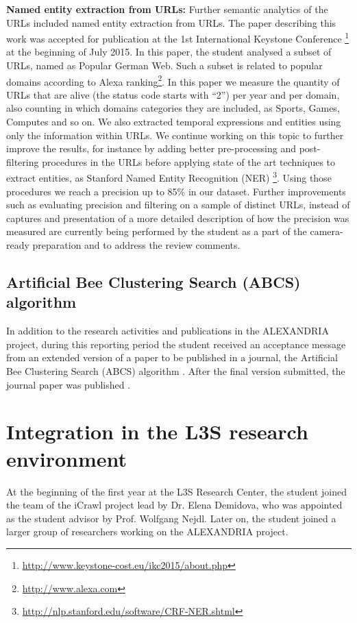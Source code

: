 \documentclass[a4paper,11pt]{report}
\begin{document}
\textbf{Named entity extraction from URLs:}
Further semantic analytics of the URLs included named entity extraction from URLs. 
The paper describing this work was accepted for publication at the 
1st International Keystone Conference
\footnote{\url{http://www.keystone-cost.eu/ikc2015/about.php}} at the beginning of
July 2015. 
In this paper, the student analysed a subset of URLs, named as Popular German
Web. Such a subset is related to popular domains according to Alexa
ranking\footnote{\url{http://www.alexa.com}}. In this paper we measure the
quantity of URLs that are alive (the status code starts with ``2'') per year and per domain, 
also counting in which domains categories they are included, as Sports, Games,
Computes and so on. We also extracted temporal expressions
and entities using only the information within URLs.
%
We continue working on this topic to further improve the results, for instance by adding better
pre-processing and post-filtering procedures in the URLs before applying state
of the art techniques to extract entities, as Stanford Named Entity Recognition
(NER) \footnote{\url{http://nlp.stanford.edu/software/CRF-NER.shtml}}. Using
those procedures we reach a precision up to 85\% in our dataset. 
%
Further improvements such as evaluating
precision and filtering on a sample of distinct URLs, instead of captures and
presentation of a more detailed description of how the precision was measured are currently 
being performed by the student as a part of the camera-ready preparation
and to address the review comments.

\subsection{Artificial Bee Clustering Search (ABCS) algorithm}
In addition to the research activities and publications in the ALEXANDRIA project, during this reporting period 
the student 
received an acceptance message from an extended version of a paper to be published in
a journal, the Artificial Bee Clustering Search (ABCS) algorithm \cite{costaiwann13}. 
After the final version submitted, the journal paper was published \cite{costa2014}. 

\section{Integration in the L3S research environment}
At the beginning of the first year at the L3S Research Center, the student 
joined the team of the iCrawl project lead by Dr. Elena Demidova, who was appointed as the student advisor
by Prof. Wolfgang Nejdl. Later on, the student joined a larger group of researchers working on the 
ALEXANDRIA project.
\end{document}
